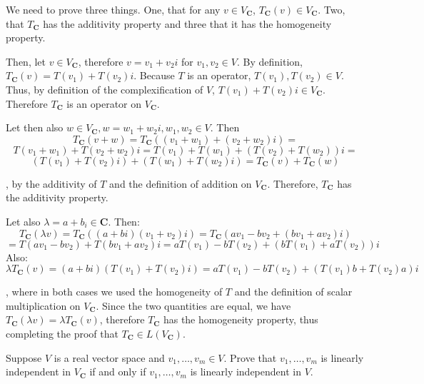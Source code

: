 \begin{solution}

    We need to prove three things. One, that for any $v \in V_\mathbf{C}$, $T_\mathbf{C}(v) \in V_\mathbf{C}$. Two, that $T_\mathbf{C}$ has the additivity property and three that it has the homogeneity property.

    Then, let $v \in V_\mathbf{C}$, therefore $v = v_1+v_2i$ for $v_1, v_2 \in V$. By definition, $T_\mathbf{C}(v) = T(v_1) + T(v_2)i$. Because $T$ is an operator, $T(v_1), T(v_2) \in V$. Thus, by definition of the complexification of $V$, $T(v_1)+T(v_2)i \in V_\mathbf{C}$. Therefore $T_\mathbf{C}$ is an operator on $V_\mathbf{C}$.

    Let then also $w \in V_\mathbf{C}, w = w_1+w_2i, w_1, w_2 \in V$. Then 
    $$T_\mathbf{C}(v+w) = T_\mathbf{C}((v_1+w_1)+(v_2+w_2)i) = $$
    $$T(v_1+w_1) + T(v_2+w_2)i = T(v_1)+T(w_1) + (T(v_2)+T(w_2))i = $$
    $$(T(v_1)+T(v_2)i)+(T(w_1)+T(w_2)i) = T_\mathbf{C}(v)+T_\mathbf{C}(w)$$

    , by the additivity of $T$ and the definition of addition on $V_\mathbf{C}$. Therefore, $T_\mathbf{C}$ has the additivity property.

    Let also $\lambda = a+b_i \in \mathbf{C}$. Then:
    $$T_\mathbf{C}(\lambda v) = T_\mathbf{C}((a+bi)(v_1+v_2)i) = T_\mathbf{C}(av_1 - bv_2 + (bv_1 + av_2)i) $$
    $$= T(av_1-bv_2)+ T(bv_1+av_2)i = aT(v_1) - bT(v_2) + (bT(v_1) + aT(v_2))i$$
    Also:
    $$\lambda T_\mathbf{C}(v) = (a+bi)(T(v_1)+T(v_2)i) = aT(v_1) - bT(v_2) + (T(v_1)b + T(v_2)a)i$$

    , where in both cases we used the homogeneity of $T$ and the definition of scalar multiplication on $V_\mathbf{C}$. Since the two quantities are equal, we have $T_\mathbf{C}(\lambda v) = \lambda T_\mathbf{C}(v)$, therefore $T_\mathbf{C}$ has the homogeneity property, thus completing the proof that $T_\mathbf{C} \in L(V_\mathbf{C})$.
    
\end{solution}

\newpage
\begin{exercise}{3}
    Suppose $V$ is a real vector space and $v_1, \ldots, v_m \in V$. Prove that $v_1, \ldots, v_m$ is linearly independent in $V_\mathbf{C}$ if and only if $v_1, \ldots, v_m$ is linearly independent in $V$.
\end{exercise}

